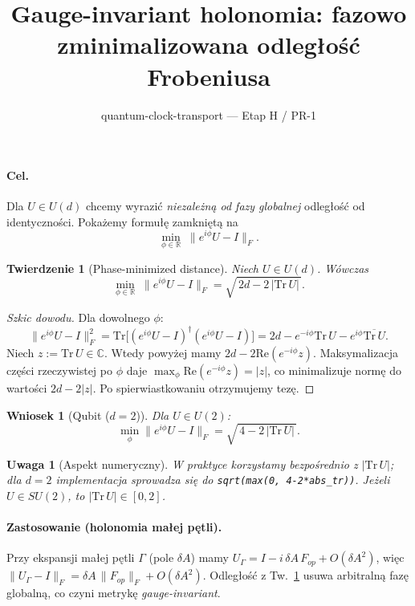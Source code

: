 \documentclass[11pt]{article}
\title{Gauge-invariant holonomia: fazowo zminimalizowana odległość Frobeniusa}
\author{quantum-clock-transport — Etap H / PR-1}
\date{}
\newtheorem{theorem}{Twierdzenie}
\newtheorem{corollary}{Wniosek}
\newtheorem{remark}{Uwaga}
\begin{document}
\maketitle

\paragraph{Cel.}
Dla $U\in U(d)$ chcemy wyrazić \emph{niezależną od fazy globalnej} odległość od identyczności.
Pokażemy formułę zamkniętą na
\[
\min_{\phi\in\mathbb{R}}\;\bigl\|e^{i\phi}U-I\bigr\|_F.
\]

\begin{theorem}[Phase-minimized distance]\label{thm:phase-min}
Niech $U\in U(d)$. Wówczas
\begin{equation}
\min_{\phi\in\mathbb{R}}\;\bigl\|e^{i\phi}U-I\bigr\|_F
=\sqrt{\,2d-2\,|\mathrm{Tr}\,U|\,}.
\end{equation}
\end{theorem}

\begin{proof}[Szkic dowodu]
Dla dowolnego $\phi$:
\[
\|e^{i\phi}U-I\|_F^2
=\mathrm{Tr}\bigl[(e^{i\phi}U-I)^\dagger(e^{i\phi}U-I)\bigr]
=2d- e^{-i\phi}\mathrm{Tr}\,U - e^{i\phi}\overline{\mathrm{Tr}\,U}.
\]
Niech $z:=\mathrm{Tr}\,U\in\mathbb{C}$. Wtedy powyżej mamy $2d - 2\mathrm{Re}(e^{-i\phi}z)$.
Maksymalizacja części rzeczywistej po $\phi$ daje $\max_\phi \mathrm{Re}(e^{-i\phi}z)=|z|$,
co minimalizuje normę do wartości $2d-2|z|$.
Po spierwiastkowaniu otrzymujemy tezę.
\end{proof}

\begin{corollary}[Qubit ($d=2$)]
Dla $U\in U(2)$:
\[
\min_{\phi}\|e^{i\phi}U-I\|_F=\sqrt{\,4-2\,|\mathrm{Tr}\,U|\,}.
\]
\end{corollary}

\begin{remark}[Aspekt numeryczny]
W praktyce korzystamy bezpośrednio z $|\mathrm{Tr}\,U|$;
dla $d=2$ implementacja sprowadza się do \texttt{sqrt(max(0, 4-2*abs\_tr))}. 
Jeżeli $U\in SU(2)$, to $|\mathrm{Tr}\,U|\in[0,2]$.
\end{remark}

\paragraph{Zastosowanie (holonomia małej pętli).}
Przy ekspansji małej pętli $\Gamma$ (pole $\delta A$) mamy
$U_\Gamma=I - i\,\delta A\,F_{op}+O(\delta A^2)$,
więc $\|U_\Gamma-I\|_F = \delta A\,\|F_{op}\|_F + O(\delta A^2)$.
Odległość z Tw.~\ref{thm:phase-min} usuwa arbitralną fazę globalną, co czyni metrykę \emph{gauge-invariant}.
\end{document}
